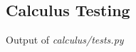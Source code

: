 \subsection{Calculus Testing}\label{ssec:appendix-calculus-tests}
    Output of \textit{calculus/tests.py}
